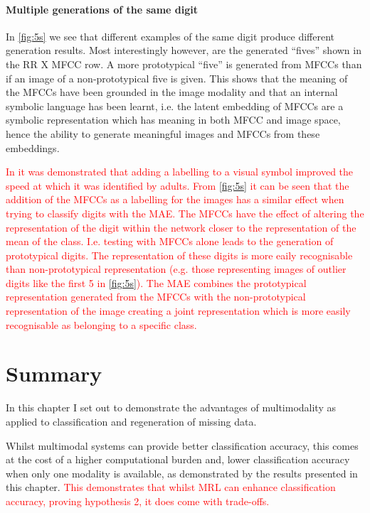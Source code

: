 \paragraph{Multiple generations of the same digit}
In \autoref{fig:5s} we see that different examples of the same digit produce different generation results. Most interestingly however, are the generated ``fives'' shown in the RR X MFCC row. A more prototypical ``five'' is generated from \acp{MFCC} than if an image of a non-prototypical five is given. This shows that the meaning of the \acp{MFCC} have been grounded in the image modality and that an internal symbolic language has been learnt, i.e. the latent embedding of \acp{MFCC} are a symbolic representation which has meaning in both \ac{MFCC} and image space, hence the ability to generate meaningful images and \acp{MFCC} from these embeddings.

\textcolor{red}{In \cite{lupyan2007reuniting} it was demonstrated that adding a labelling to a visual symbol improved the speed at which it was identified by adults. From \autoref{fig:5s} it can be seen that the addition of the MFCCs as a labelling for the images has a similar effect when trying to classify digits with the \ac{MAE}. The MFCCs have the effect of altering the representation of the digit within the network closer to the representation of the mean of the class. I.e. testing with MFCCs alone leads to the generation of prototypical digits. The representation of these digits is more eaily recognisable than non-prototypical representation (e.g. those representing images of outlier digits like the first 5 in \autoref{fig:5s}). The \ac{MAE} combines the prototypical representation generated from the MFCCs with the non-prototypical representation of the image creating a joint representation which is more easily recognisable as belonging to a specific class.}

\section{Summary}
In this chapter I set out to demonstrate the advantages of multimodality as applied to classification and regeneration of missing data.

Whilst multimodal systems can provide better classification accuracy, this comes at the cost of a higher computational burden and, lower classification accuracy when only one modality is available, as demonstrated by the results presented in this chapter. \textcolor{red}{This demonstrates that whilst MRL can enhance classification accuracy, proving hypothesis 2, it does come with trade-offs.}

